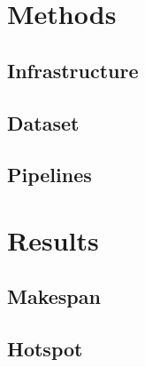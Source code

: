 \documentclass[conference,draft]{IEEEtran}
\begin{document}
\section{Methods}
\subsection{Infrastructure}

\subsection{Dataset}

\subsection{Pipelines}



\section{Results}

\subsection{Makespan}


\subsection{Hotspot}
% 
\end{document}
